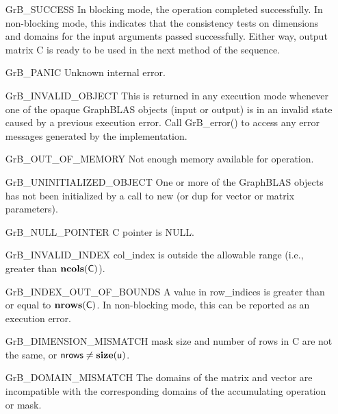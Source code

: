 \begin{itemize}[leftmargin=2.1in]
    \item[{\sf GrB\_SUCCESS}]         In blocking mode, the operation completed
    successfully. In non-blocking mode, this indicates that the consistency 
    tests on dimensions and domains for the input arguments passed successfully. 
    Either way, output matrix {\sf C} is ready to be used in the next method of 
    the sequence.

    \item[{\sf GrB\_PANIC}]            Unknown internal error.
    
    \item[{\sf GrB\_INVALID\_OBJECT}] This is returned in any execution mode 
    whenever one of the opaque GraphBLAS objects (input or output) is in an invalid 
    state caused by a previous execution error.  Call {GrB\_error()} to access 
    any error messages generated by the implementation.

    \item[{\sf GrB\_OUT\_OF\_MEMORY}]  Not enough memory available for operation.
    
    \item[{\sf GrB\_UNINITIALIZED\_OBJECT}] One or more of the GraphBLAS objects
    has not been initialized by a call to {\sf new} (or {\sf dup} for vector or
    matrix parameters).
    
    \item[{\sf GrB\_NULL\_POINTER}]    {\sf C} pointer is {\sf NULL}.

    \item[{\sf GrB\_INVALID\_INDEX}]    {\sf col\_index} is outside the allowable 
    range (i.e., greater than $\bold{ncols}({\sf C})$).

    \item[{\sf GrB\_INDEX\_OUT\_OF\_BOUNDS}]  A value in {\sf row\_indices} 
    is greater than or equal to $\bold{nrows}({\sf C})$.  In 
    non-blocking mode, this can be reported as an execution error.
    
    \item[{\sf GrB\_DIMENSION\_MISMATCH}] {\sf mask} size and number of rows
    in {\sf C} are not the same, or ${\sf nrows} \neq \bold{size}({\sf u})$.

    \item[{\sf GrB\_DOMAIN\_MISMATCH}]     The domains of the matrix and vector
    are incompatible with the corresponding domains of the accumulating 
    operation or mask.
\end{itemize}

